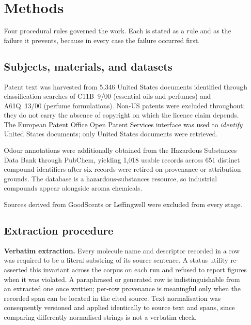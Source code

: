 \documentclass[
  computerscience
]{genesisl1-paper}
\begin{document}
\section{Methods}

Four procedural rules governed the work. Each is stated as a rule and as the failure it
prevents, because in every case the failure occurred first.

\subsection{Subjects, materials, and datasets}

Patent text was harvested from 5{,}346 United States documents identified through
classification searches of C11B~9/00 (essential oils and perfumes) and A61Q~13/00
(perfume formulations). Non-US patents were excluded throughout: they do not carry the
absence of copyright on which the licence claim depends. The European Patent Office Open
Patent Services interface was used to \emph{identify} United States documents; only
United States documents were retrieved.

Odour annotations were additionally obtained from the Hazardous Substances Data Bank
through PubChem, yielding 1{,}018 usable records across 651 distinct compound
identifiers after six records were retired on provenance or attribution grounds. The
database is a hazardous-substances resource, so industrial compounds appear alongside
aroma chemicals.

Sources derived from GoodScents or Leffingwell were excluded from every stage.

\subsection{Extraction procedure}

\textbf{Verbatim extraction.} Every molecule name and descriptor recorded in a row was
required to be a literal substring of its source sentence. A status utility re-asserted
this invariant across the corpus on each run and refused to report figures when it was
violated. A paraphrased or generated row is indistinguishable from an extracted one once
written; per-row provenance is meaningful only when the recorded span can be located in
the cited source. Text normalisation was consequently versioned and applied identically
to source text and spans, since comparing differently normalised strings is not a
verbatim check.
\end{document}
